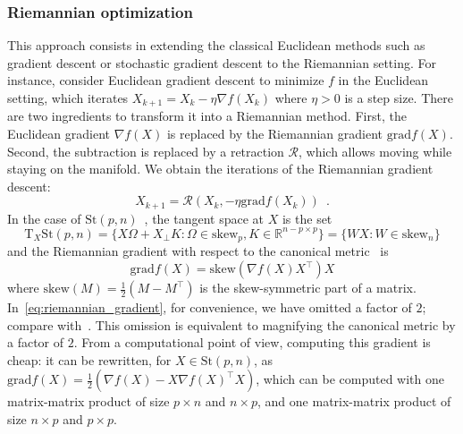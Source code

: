 \documentclass[twoside,11pt]{article}
\newcommand{\grad}{{\mathrm{grad}}}
\newcommand{\stiefel}{{\mathrm{St}(p, n)}}
\newcommand{\sk}{{\mathrm{skew}}}
\newcommand{\tangent}{{\mathrm{T}_X\stiefel}}
\begin{document}
\subsubsection{Riemannian optimization}
\label{subsec:riem_optim}
This approach consists in extending the classical Euclidean methods such as
gradient descent or stochastic gradient descent to
the Riemannian setting. For instance, consider Euclidean gradient descent to minimize $f$ in the Euclidean setting, which iterates $X_{k+1}= X_k - \eta \nabla f(X_k)$ where $\eta > 0$ is a step size. There are two ingredients to transform it into a Riemannian method. First, the Euclidean gradient $\nabla f(X)$ is replaced by the Riemannian gradient $\grad f(X)$. Second, the subtraction is replaced by a retraction $\mathcal{R}$, which allows moving while staying on the manifold. We obtain the iterations of the Riemannian gradient descent:
%
\begin{equation}
  \label{eq:riemannian_gradient_descent}
  X_{k+1} = \mathcal{R}(X_k, -\eta \grad f(X_k))\enspace.
\end{equation}
In the case of $\stiefel$~\citep{edelman1998geometry}, the tangent space at $X$ is the set
\begin{equation}
  \label{eq:tangent_space}
  \tangent = \{X\Omega + X_{\perp}K:\Omega \in\sk_p, K\in\mathbb{R}^{n - p \times p}\} = \{WX: W \in \sk_n\}
\end{equation}
and the Riemannian gradient with respect to the canonical metric~\citep{edelman1998geometry} is 
\begin{equation}
  \label{eq:riemannian_gradient}
  \grad f(X) = \sk(\nabla f(X)X^\top)X
\end{equation}
where $\sk(M) = \frac12(M - M^\top)$ is the skew-symmetric part of a matrix. In~\eqref{eq:riemannian_gradient}, for convenience, we have omitted a factor of $2$; compare with~\cite[\S 3]{gao2022optimization}. This omission is equivalent to magnifying the canonical metric by a factor of $2$.
From a computational point of view,
computing this gradient is cheap: it can be rewritten, for $X\in\stiefel$, as $\grad f(X) = \frac12(\nabla f(X) - X\nabla f(X)^\top X)$, which can be computed with one matrix-matrix product of size $p\times n$ and $n\times p$, and one matrix-matrix product of size $n \times p$ and $p\times p$.

%
\end{document}
